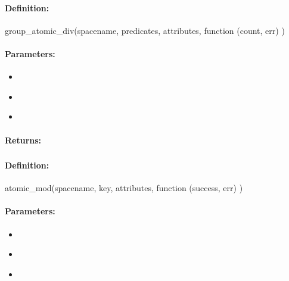 \paragraph{Definition:}
\begin{javascriptcode}
group_atomic_div(spacename, predicates, attributes, function (count, err) {})
\end{javascriptcode}
\paragraph{Parameters:}
\begin{itemize}[noitemsep]
\item {}\\

\item {}\\

\item {}\\

\end{itemize}

\paragraph{Returns:}


\pagebreak
\subsubsection{}
\label{api:nodejs:atomic_mod}


\paragraph{Definition:}
\begin{javascriptcode}
atomic_mod(spacename, key, attributes, function (success, err) {})
\end{javascriptcode}
\paragraph{Parameters:}
\begin{itemize}[noitemsep]
\item {}\\

\item {}\\

\item {}\\

\end{itemize}

